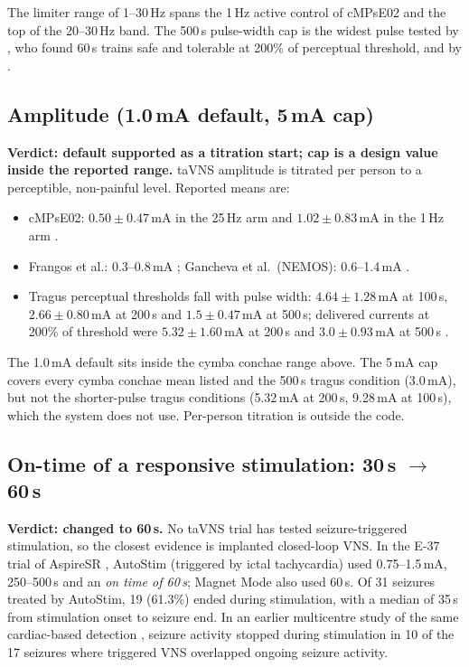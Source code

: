 \documentclass[10pt,a4paper]{article}
\newcommand{\us}{\texorpdfstring{\,\textmu s}{ us}}
\newcommand{\becomes}{\texorpdfstring{$\rightarrow$}{to}}
\begin{document}
The limiter range of 1--30\,Hz spans the 1\,Hz active control of cMPsE02 \parencite{bauer2016} and the top of the
20--30\,Hz band. The 500\us{} pulse-width cap is the widest pulse tested by \textcite{badran2018}, who found 60\,s trains
safe and tolerable at 200\% of perceptual threshold, and by \textcite{yakunina2017}.

\subsection{Amplitude (1.0\,mA default, 5\,mA cap)}\label{sec:amp}
\textbf{Verdict: default supported as a titration start; cap is a design value inside the reported range.}
taVNS amplitude is titrated per person to a perceptible, non-painful level. Reported means are:
\begin{itemize}
  \item cMPsE02: $0.50\pm0.47$\,mA in the 25\,Hz arm and $1.02\pm0.83$\,mA in the 1\,Hz arm \parencite{bauer2016}.
  \item Frangos et al.: 0.3--0.8\,mA \parencite[Table 2]{yap2020}; Gancheva et al.\ (NEMOS): 0.6--1.4\,mA
        \parencite{farmer2020}.
  \item Tragus perceptual thresholds fall with pulse width: $4.64\pm1.28$\,mA at 100\us, $2.66\pm0.80$\,mA at 200\us{}
        and $1.5\pm0.47$\,mA at 500\us; delivered currents at 200\% of threshold were $5.32\pm1.60$\,mA at 200\us{} and
        $3.0\pm0.93$\,mA at 500\us{} \parencite{badran2018}.
\end{itemize}
The 1.0\,mA default sits inside the cymba conchae range above. The 5\,mA cap covers every cymba conchae mean listed
and the 500\us{} tragus condition (3.0\,mA), but not the shorter-pulse tragus conditions (5.32\,mA at 200\us,
9.28\,mA at 100\us), which the system does not use. Per-person titration is outside the code.

\subsection{On-time of a responsive stimulation: 30\,s \becomes{} 60\,s}\label{sec:ontime}
\textbf{Verdict: changed to 60\,s.} No taVNS trial has tested seizure-triggered stimulation, so the closest evidence is
implanted closed-loop VNS. In the E-37 trial of AspireSR \parencite{fisher2016}, AutoStim (triggered by ictal
tachycardia) used 0.75--1.5\,mA, 250--500\us{} and an \emph{on time of 60\,s}; Magnet Mode also used 60\,s. Of 31
seizures treated by AutoStim, 19 (61.3\%) ended during stimulation, with a median of 35\,s from stimulation onset to
seizure end. In an earlier multicentre study of the same cardiac-based detection \parencite{boon2015}, seizure activity stopped
during stimulation in 10 of the 17 seizures where triggered VNS overlapped ongoing seizure activity.
\end{document}
